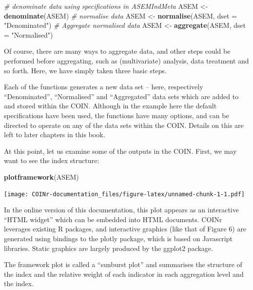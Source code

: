 \documentclass[
]{book}
\newenvironment{Shaded}{\begin{snugshade}}{\end{snugshade}}
\newcommand{\CommentTok}[1]{\textcolor[rgb]{0.56,0.35,0.01}{\textit{#1}}}
\newcommand{\DataTypeTok}[1]{\textcolor[rgb]{0.13,0.29,0.53}{#1}}
\newcommand{\KeywordTok}[1]{\textcolor[rgb]{0.13,0.29,0.53}{\textbf{#1}}}
\newcommand{\NormalTok}[1]{#1}
\newcommand{\StringTok}[1]{\textcolor[rgb]{0.31,0.60,0.02}{#1}}
\begin{document}
\begin{Shaded}
\begin{Highlighting}[]

\CommentTok{# denominate data using specifications in ASEMIndMeta}
\NormalTok{ASEM <-}\StringTok{ }\KeywordTok{denominate}\NormalTok{(ASEM)}
\CommentTok{# normalise data}
\NormalTok{ASEM <-}\StringTok{ }\KeywordTok{normalise}\NormalTok{(ASEM, }\DataTypeTok{dset =} \StringTok{"Denominated"}\NormalTok{)}
\CommentTok{# Aggregate normalised data}
\NormalTok{ASEM <-}\StringTok{ }\KeywordTok{aggregate}\NormalTok{(ASEM, }\DataTypeTok{dset =} \StringTok{"Normalised"}\NormalTok{)}
\end{Highlighting}
\end{Shaded}

Of course, there are many ways to aggregate data, and other steps could be performed before aggregating, such as (multivariate) analysis, data treatment and so forth. Here, we have simply taken three basic steps.

Each of the functions generates a new data set -- here, respectively ``Denominated'', ``Normalised'' and ``Aggregated'' data sets which are added to and stored within the COIN. Although in the example here the default specifications have been used, the functions have many options, and can be directed to operate on any of the data sets within the COIN. Details on this are left to later chapters in this book.

At this point, let us examine some of the outputs in the COIN. First, we may want to see the index structure:

\begin{Shaded}
\begin{Highlighting}[]
\KeywordTok{plotframework}\NormalTok{(ASEM)}
\end{Highlighting}
\end{Shaded}

\texttt{[image: COINr-documentation\_files/figure-latex/unnamed-chunk-1-1.pdf]}

In the online version of this documentation, this plot appears as an interactive ``HTML widget'' which can be embedded into HTML documents. COINr leverages existing R packages, and interactive graphics (like that of Figure 6) are generated using bindings to the plotly package, which is based on Javascript libraries. Static graphics are largely produced by the ggplot2 package.

The framework plot is called a ``sunburst plot'' and summarises the structure of the index and the relative weight of each indicator in each aggregation level and the index.
\end{document}
